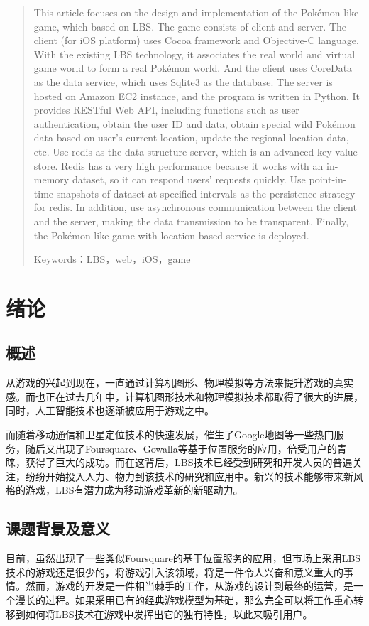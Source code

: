 \documentclass{article}
\begin{document}
\begin{CJK}{UTF8}{gbsn}
\begin{abstract}
    This article focuses on the design and implementation of the Pokémon like game, which based on LBS. The game consists of client and server. The client (for iOS platform) uses Cocoa framework and Objective-C language. With the existing LBS technology, it associates the real world and virtual game world to form a real Pokémon world. And the client uses CoreData as the data service, which uses Sqlite3 as the database. The server is hosted on Amazon EC2 instance, and the program is written in Python. It provides RESTful Web API, including functions such as user authentication, obtain the user ID and data, obtain special wild Pokémon data based on user's current location, update the regional location data, etc. Use redis as the data structure server, which is an advanced key-value store. Redis has a very high performance because it works with an in-memory dataset, so it can respond users' requests quickly. Use point-in-time snapshots of dataset at specified intervals as the persistence strategy for redis. In addition, use asynchronous communication between the client and the server, making the data transmission to be transparent. Finally, the Pokémon like game with location-based service is deployed.

    Keywords：LBS，web，iOS，game
    
  \end{abstract}


  \newpage
  \section{绪论}
	\subsection{概述}
  从游戏的兴起到现在，一直通过计算机图形、物理模拟等方法来提升游戏的真实感。而也正在过去几年中，计算机图形技术和物理模拟技术都取得了很大的进展，同时，人工智能技术也逐渐被应用于游戏之中。

  而随着移动通信和卫星定位技术的快速发展，催生了Google地图等一些热门服务，随后又出现了Foursquare、Gowalla等基于位置服务的应用，倍受用户的青睐，获得了巨大的成功。而在这背后，LBS技术已经受到研究和开发人员的普遍关注，纷纷开始投入人力、物力到该技术的研究和应用中。新兴的技术能够带来新风格的游戏，LBS有潜力成为移动游戏革新的新驱动力。

	\subsection{课题背景及意义}
  目前，虽然出现了一些类似Foursquare的基于位置服务的应用，但市场上采用LBS技术的游戏还是很少的，将游戏引入该领域，将是一件令人兴奋和意义重大的事情。然而，游戏的开发是一件相当棘手的工作，从游戏的设计到最终的运营，是一个漫长的过程。如果采用已有的经典游戏模型为基础，那么完全可以将工作重心转移到如何将LBS技术在游戏中发挥出它的独有特性，以此来吸引用户。


\end{CJK}
\end{document}
